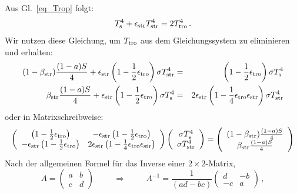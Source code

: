 Aus Gl.\ \ref{eq_Trop} folgt:
\begin{equation}
         T_{\rm s}^4 + \epsilon_{\rm str} T_{\rm str}^4 = 2 T_{\rm tro}^4 \, .
\end{equation}
Wir nutzen diese Gleichung, um $T_{\rm tro}$ aus dem Gleichungssystem
zu eliminieren und erhalten:
\begin{eqnarray}
      (1-\beta_{\rm str}) \frac{(1-a)S}{4}  + 
        \epsilon_{\rm str} \left(1-\frac{1}{2} \epsilon_{\rm tro}\right) \sigma T_{\rm str}^4 &=& 
        \left( 1 - \frac{1}{2} \epsilon_{\rm tro} \right)  \sigma T_{\rm s}^4   \\
        \beta_{\rm str} \frac{(1-a)S}{4} +
        \epsilon_{\rm str} \left(1- \frac{1}{2} \epsilon_{\rm tro} \right) \sigma T_{\rm s}^4 
        &=&  2 \epsilon_{\rm str} \left( 1 - \frac{1}{4} \epsilon_{\rm tro} \epsilon_{\rm str} \right) \sigma T_{\rm str}^4 
\end{eqnarray}
oder in Matrixschreibweise:
\begin{equation}
    \left( \begin{array}{cc}  \left( 1 - \frac{1}{2} \epsilon_{\rm tro} \right) &  
                  - \epsilon_{\rm str} \left(1- \frac{1}{2} \epsilon_{\rm tro} \right) \\
     - \epsilon_{\rm str} \left( 1 - \frac{1}{2} \epsilon_{\rm tro} \right)  & 
                       2 \epsilon_{\rm str} \left( 1 - \frac{1}{4} \epsilon_{\rm tro} \epsilon_{\rm str} \right)
     \end{array} \right) \left( \begin{array}{c}  \sigma T_{\rm s}^4 \\
       \sigma T_{\rm str}^4 \end{array} \right) 
      =  \left( \begin{array}{c} (1-\beta_{\rm str}) \frac{(1-a)S}{4} \\ 
             \beta_{\rm str} \frac{(1-a)S}{4}  \end{array} \right) 
\end{equation}
Nach der allgemeinen Formel f\"ur das Inverse einer $2\times 2$-Matrix,
\begin{equation}
    A = \left( \begin{array}{cc}  a & b \\ c & d \end{array} \right)  \hspace{1cm} \Longrightarrow \hspace{1cm}
    A^{-1} = \frac{1}{(ad-bc)} \left( \begin{array}{cc}  d & -b \\ -c & a \end{array} \right)   \, ,
\end{equation}
